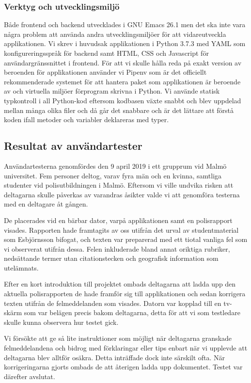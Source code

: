 \documentclass[swedish]{maucsthesis}
\begin{document}
\subsubsection{Verktyg och utvecklingsmiljö}

Både frontend och backend utvecklades i GNU Emacs 26.1 men det ska inte vara några
problem att använda andra utvecklingsmiljöer för att vidareutveckla
applikationen. Vi skrev i huvudsak applikationen i Python 3.7.3 med YAML som
konfigureringsspråk för backend samt HTML, CSS och Javascript för
användargränssnittet i frontend. För att vi skulle hålla reda på exakt version
av beroenden för applikationen använder vi Pipenv som är det officiellt
rekommenderade systemet för att hantera paket som applikationen är beroende av
och virtuella miljöer förprogram skrivna i Python. Vi använde statisk typkontroll
i all Python-kod eftersom kodbasen växte snabbt och blev uppdelad
mellan många olika filer och då går det snabbare och är det lättare att förstå
koden ifall metoder och variabler deklareras med typer.


\subsection{Resultat av användartester}

Användartesterna genomfördes den 9 april 2019 i ett grupprum vid Malmö
universitet. Fem personer deltog, varav fyra män och en kvinna, samtliga
studenter vid polisutbildningen i Malmö. Eftersom vi ville undvika risken att
deltagarna skulle påverkas av varandras åsikter valde vi att genomföra testerna
med en deltagare åt gången.

De placerades vid en bärbar dator, varpå applikationen samt en polisrapport
visades. Rapporten hade framtagits av oss utifrån det urval av studentmaterial
som Esbjörnsson bifogat, och texten var preparerad med ett tiotal vanliga
fel som vi observerat utifrån dessa. Felen inkluderade bland annat oriktiga
rubriker, nedsättande termer utan citationstecken och geografisk information som
utelämnats.

Efter en kort introduktion till projektet ombads deltagarna att ladda upp den
aktuella polisrapporten de hade framför sig till applikationen och sedan
korrigera texten utifrån de felmeddelanden som visades. Datorn var kopplad till
en tv-skärm som var belägen precis bakom deltagarna, detta för att vi som
testledare skulle kunna observera hur testet gick.

Vi försökte att ge så lite instruktioner som möjligt när deltagarna granskade
felmeddelandena och bidrog med förklaringar eller tips enbart när vi upplevde
att deltagarna blev alltför osäkra. Detta inträffade dock inte särskilt ofta.
När korrigeringarna gjorts ombads de att återigen ladda upp dokumentet. Testet
var därefter avslutat.
\end{document}

